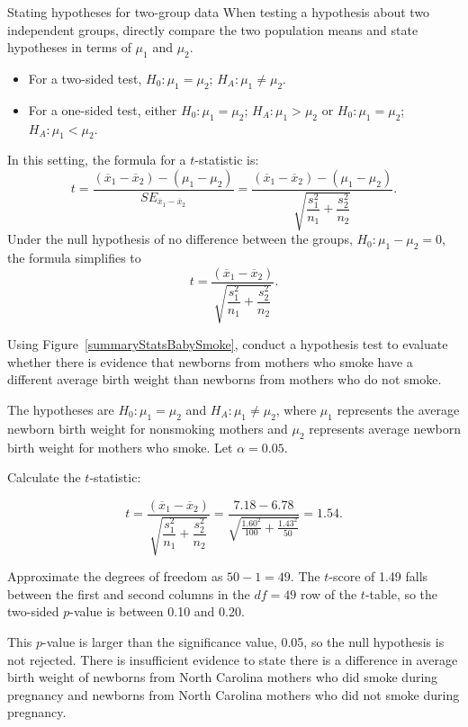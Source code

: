 \begin{onebox}{Stating hypotheses for two-group data}
When testing a hypothesis about two independent groups, directly compare the two population means and state hypotheses in terms of $\mu_1$ and $\mu_2$.
\begin{itemize}
	\item For a two-sided test, $H_0: \mu_{1} = \mu_{2}$; $H_A: \mu_{1} \neq \mu_{2}$.
	\item For a one-sided test, either $H_0: \mu_{1} = \mu_{2}$; $H_A: \mu_{1} > \mu_{2}$ or  $H_0: \mu_{1} = \mu_{2}$; $H_A: \mu_{1} < \mu_{2}$.
\end{itemize}
\end{onebox}


\textD{\newpage}

In this setting, the formula for a $t$-statistic is:
\[
t = \dfrac{(\overline{x}_1 - \overline{x}_2) - (\mu_1 - \mu_2)}{SE_{\overline{x}_{1} - \overline{x}_{2}}} = \dfrac{(\overline{x}_1 - \overline{x}_2) - (\mu_1 - \mu_2)}{\sqrt{\dfrac{s_{1}^{2}}{n_1} + \dfrac{s_{2}^{2}}{n_2}}}.
\]
Under the null hypothesis of no difference between the groups, $H_0: \mu_{1} - \mu_{2} = 0$, the formula simplifies to
\[t = \dfrac{(\overline{x}_1 - \overline{x}_2)}{\sqrt{\dfrac{s_{1}^{2}}{n_1} + \dfrac{s_{2}^{2}}{n_2}}}.\]

\begin{examplewrap}
\begin{nexample}{Using Figure~\ref{summaryStatsBabySmoke}, conduct a hypothesis test to evaluate whether there is evidence that newborns from mothers who smoke have a different average birth weight than newborns from mothers who do not smoke.}

The hypotheses are $H_0: \mu_{1} = \mu_{2}$ and $H_A: \mu_{1} \neq \mu_{2}$, where $\mu_{1}$ represents the average newborn birth weight for nonsmoking mothers and $\mu_{2}$ represents average newborn birth weight for mothers who smoke. Let $\alpha = 0.05$. 	

Calculate the $t$-statistic:

\[t = \dfrac{(\overline{x}_1 - \overline{x}_2)}{\sqrt{\dfrac{s_{1}^{2}}{n_1} + \dfrac{s_{2}^{2}}{n_2}}} = \dfrac{7.18 - 6.78}{\sqrt{\frac{1.60^2}{100} + \frac{1.43^2}{50}}} = 1.54.\]

Approximate the degrees of freedom as $50 - 1 = 49$. The $t$-score of 1.49 falls between the first and second columns in the $df = 49$ row of the $t$-table, so the two-sided $p$-value is between 0.10 and 0.20.\footnotemark{}

This $p$-value is larger than the significance value, 0.05, so the null hypothesis is not rejected. There is insufficient evidence to state there is a difference in average birth weight of newborns from North Carolina mothers who did smoke during pregnancy and newborns from North Carolina mothers who did not smoke during pregnancy.
\end{nexample}
\end{examplewrap}

